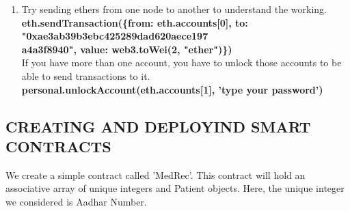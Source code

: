 \documentclass[journal,12pt,twocolumn]{IEEEtran}
\begin{document}
\begin{enumerate}
\item Try sending ethers from one node to another to understand the working.\\
 \textbf{eth.sendTransaction(\{{from: eth.accounts[0], to: "0xae3ab39b3ebc425289dad620aece197\\a4a3f8940", value: web3.toWei(2, "ether")\}})} \\
 
If you have more than one account, you have to unlock those accounts to be able to send transactions to it.\\
 
\textbf{personal.unlockAccount(eth.accounts[1], 'type your password')}
\end{enumerate}


\subsection{CREATING AND DEPLOYIND SMART CONTRACTS}
We create a simple contract called 'MedRec'. This contract will hold an associative array of unique integers and Patient objects. Here, the unique integer we considered is Aadhar Number.\\
\end{document}
